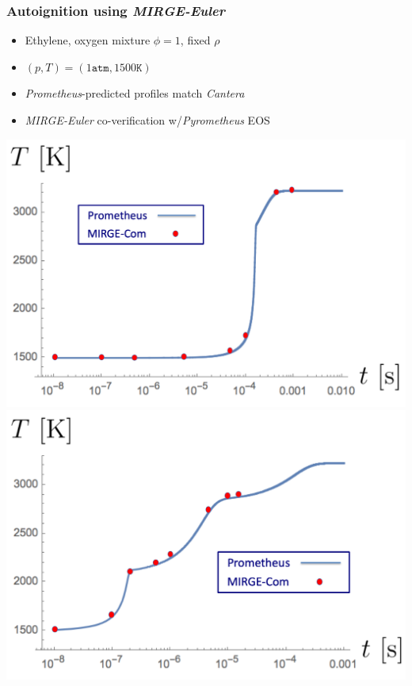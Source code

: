 \begin{frame}\frametitle{Autoignition using \textit{MIRGE-Euler}}
  \begin{multicols}{2}
    \begin{itemize}
      \item Ethylene, oxygen mixture $\phi=1$, fixed $\rho$
      \item $(p, T) = (1 \mathtt{atm}, 1500 \mathtt{K})$
      \item \textit{Prometheus}-predicted profiles match \textit{Cantera}
      \item \textit{MIRGE-Euler} co-verification w/\textit{Pyrometheus} EOS
    \end{itemize}
  \end{multicols}
  \begin{multicols}{2}
    \includegraphics[width=.5\textwidth]{figures/mtc/AutoIgnition_Sudden.png}\\
    \columnbreak
    \includegraphics[width=.5\textwidth]{figures/mtc/AutoIgnition_Episodic.png}
  \end{multicols}
\end{frame}

